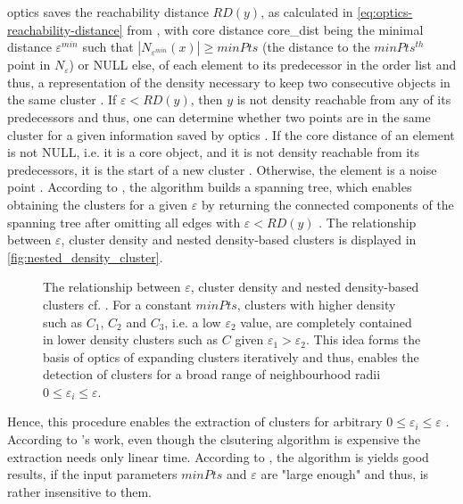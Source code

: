\ac{optics} saves the reachability distance $RD(y)$, as calculated in \autoref{eq:optics-reachability-distance} from \cite{OPTICS2013},
with core distance core\_dist being the minimal distance $\varepsilon^{min}$ such that $| N_{\varepsilon^{min}} (x) | \geq minPts$ 
(the distance to the $minPts^{th}$ point in $N_\varepsilon$) or NULL else, 
of each element to its predecessor in the order list and thus, 
a representation of the density necessary to keep two consecutive objects in the same cluster \cite{OPTICS2013}.
If $\varepsilon < RD(y)$, then $y$ is not density reachable from any of its predecessors and thus, 
one can determine whether two points are in the same cluster for a given information saved by \ac{optics} \cite{OPTICS2013, OPTICS1999}.
If the core distance of an element is not NULL, i.e. it is a core object, and it is not density reachable from its predecessors, it is the start of a new cluster \cite{OPTICS1999}.
Otherwise, the element is a noise point \cite{OPTICS1999}.
According to \citeauthor{OPTICS2013}, the algorithm builds a spanning tree, which enables obtaining the clusters for a given $\varepsilon$ by returning the connected components 
of the spanning tree after omitting all edges with $\varepsilon < RD(y)$ \cite{OPTICS2013}.
The relationship between $\varepsilon$, cluster density and nested density-based clusters is displayed in \autoref{fig:nested_density_cluster}.

\begin{figure}[htp] %
    \centering
    
    \caption{The relationship between $\varepsilon$, cluster density and nested density-based clusters cf. \cite{OPTICS1999}.
    For a constant $minPts$, clusters with higher density such as $C_1$, $C_2$ and $C_3$, i.e. a low $\varepsilon_2$ value, 
    are completely contained in lower density clusters such as $C$ given $\varepsilon_1 > \varepsilon_2$.
    This idea forms the basis of \ac{optics} of expanding clusters iteratively and thus, 
    enables the detection of clusters for a broad range of neighbourhood radii $0 \le \varepsilon_i \le \varepsilon$.
    }
    \label{fig:nested_density_cluster}
\end{figure}

Hence, this procedure enables the extraction of clusters for arbitrary $0 \le \varepsilon_i \le \varepsilon$ \cite{OPTICS_kMeans_2016, OPTICS1999}.
According to \citeauthor{OPTICS2013}'s work, even though the clsutering algorithm is expensive the extraction needs only linear time.
According to \cite{OPTICS1999}, the algorithm is yields good results, if the input parameters $minPts$ and $\varepsilon$ are "large enough" and thus, is rather insensitive to them.

